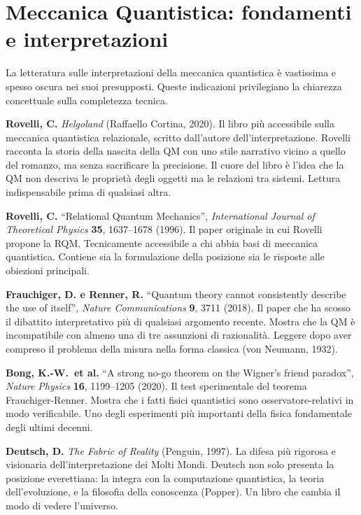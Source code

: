 \documentclass[11.5pt,a4paper,openany]{book}
\theoremstyle{remark}
\begin{document}
\bigskip

\section{Meccanica Quantistica: fondamenti e interpretazioni}

La letteratura sulle interpretazioni della meccanica quantistica è vastissima e spesso oscura nei suoi presupposti. Queste indicazioni privilegiano la chiarezza concettuale sulla completezza tecnica.

\textbf{Rovelli, C.} \textit{Helgoland} (Raffaello Cortina, 2020). Il libro più accessibile sulla meccanica quantistica relazionale, scritto dall'autore dell'interpretazione. Rovelli racconta la storia della nascita della QM con uno stile narrativo vicino a quello del romanzo, ma senza sacrificare la precisione. Il cuore del libro è l'idea che la QM non descriva le proprietà degli oggetti ma le relazioni tra sistemi. Lettura indispensabile prima di qualsiasi altra.

\textbf{Rovelli, C.} ``Relational Quantum Mechanics'', \textit{International Journal of Theoretical Physics} \textbf{35}, 1637--1678 (1996). Il paper originale in cui Rovelli propone la RQM. Tecnicamente accessibile a chi abbia basi di meccanica quantistica. Contiene sia la formulazione della posizione sia le risposte alle obiezioni principali.

\textbf{Frauchiger, D. e Renner, R.} ``Quantum theory cannot consistently describe the use of itself'', \textit{Nature Communications} \textbf{9}, 3711 (2018). Il paper che ha scosso il dibattito interpretativo più di qualsiasi argomento recente. Mostra che la QM è incompatibile con almeno una di tre assunzioni di razionalità. Leggere dopo aver compreso il problema della misura nella forma classica (von Neumann, 1932).

\textbf{Bong, K.-W.\ et al.} ``A strong no-go theorem on the Wigner's friend paradox'', \textit{Nature Physics} \textbf{16}, 1199--1205 (2020). Il test sperimentale del teorema Frauchiger-Renner. Mostra che i fatti fisici quantistici sono osservatore-relativi in modo verificabile. Uno degli esperimenti più importanti della fisica fondamentale degli ultimi decenni.

\textbf{Deutsch, D.} \textit{The Fabric of Reality} (Penguin, 1997). La difesa più rigorosa e visionaria dell'interpretazione dei Molti Mondi. Deutsch non solo presenta la posizione everettiana: la integra con la computazione quantistica, la teoria dell'evoluzione, e la filosofia della conoscenza (Popper). Un libro che cambia il modo di vedere l'universo.
\end{document}
